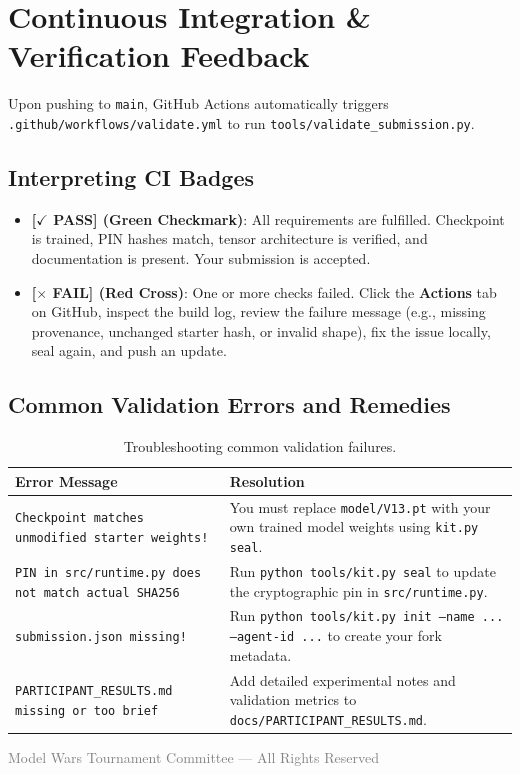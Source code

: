 \documentclass[11pt,a4paper]{article}
\begin{document}
\section{Continuous Integration \& Verification Feedback}

Upon pushing to \texttt{main}, GitHub Actions automatically triggers \texttt{.github/workflows/validate.yml} to run \texttt{tools/validate\_submission.py}.

\subsection{Interpreting CI Badges}
\begin{itemize}
    \item \textbf{\textcolor{successgreen}{[$\checkmark$ PASS] (Green Checkmark)}}: All requirements are fulfilled. Checkpoint is trained, PIN hashes match, tensor architecture is verified, and documentation is present. Your submission is accepted.
    \item \textbf{\textcolor{alertred}{[$\times$ FAIL] (Red Cross)}}: One or more checks failed. Click the \textbf{Actions} tab on GitHub, inspect the build log, review the failure message (e.g., missing provenance, unchanged starter hash, or invalid shape), fix the issue locally, seal again, and push an update.
\end{itemize}

\subsection{Common Validation Errors and Remedies}
\begin{table}[h!]
\centering
\small
\begin{tabular}{p{6.5cm}p{7.5cm}}
\toprule
\textbf{Error Message} & \textbf{Resolution} \\
\midrule
\texttt{Checkpoint matches unmodified starter weights!} & You must replace \texttt{model/V13.pt} with your own trained model weights using \texttt{kit.py seal}. \\
\texttt{PIN in src/runtime.py does not match actual SHA256} & Run \texttt{python tools/kit.py seal} to update the cryptographic pin in \texttt{src/runtime.py}. \\
\texttt{submission.json missing!} & Run \texttt{python tools/kit.py init --name ... --agent-id ...} to create your fork metadata. \\
\texttt{PARTICIPANT\_RESULTS.md missing or too brief} & Add detailed experimental notes and validation metrics to \texttt{docs/PARTICIPANT\_RESULTS.md}. \\
\bottomrule
\end{tabular}
\caption{Troubleshooting common validation failures.}
\label{tab:troubleshooting}
\end{table}

\vfill
\begin{center}
\small\textcolor{gray}{Model Wars Tournament Committee --- All Rights Reserved}
\end{center}
\end{document}
